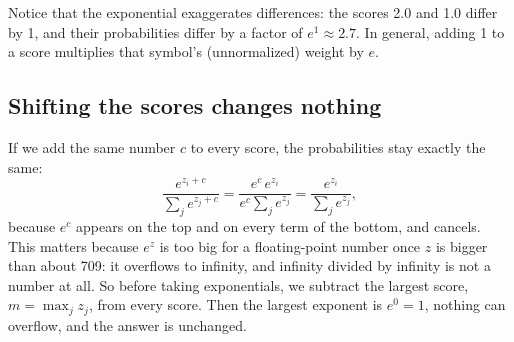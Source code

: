 \documentclass[11pt,a4paper,oneside,openany]{book}
\begin{document}
\begin{center}
\hspace{0.4cm}\hspace{0.4cm}
\end{center}

Notice that the exponential exaggerates differences: the scores 2.0 and
1.0 differ by 1, and their probabilities differ by a factor of
$e^1 \approx 2.7$. In general, adding 1 to a score multiplies that
symbol's (unnormalized) weight by $e$.

\subsection{Shifting the scores changes nothing}

If we add the same number $c$ to every score, the probabilities stay
exactly the same:
\[
  \frac{e^{z_i + c}}{\sum_j e^{z_j + c}}
  = \frac{e^{c}\, e^{z_i}}{e^{c}\sum_j e^{z_j}}
  = \frac{e^{z_i}}{\sum_j e^{z_j}} ,
\]
because $e^{c}$ appears on the top and on every term of the bottom, and
cancels. This matters because $e^{z}$ is too big for a floating-point
number once $z$ is bigger than about 709: it overflows to infinity, and
infinity divided by infinity is not a number at all. So before taking
exponentials, we subtract the largest score, $m = \max_j z_j$, from every
score. Then the largest exponent is $e^0 = 1$, nothing can overflow, and
the answer is unchanged.
\end{document}
